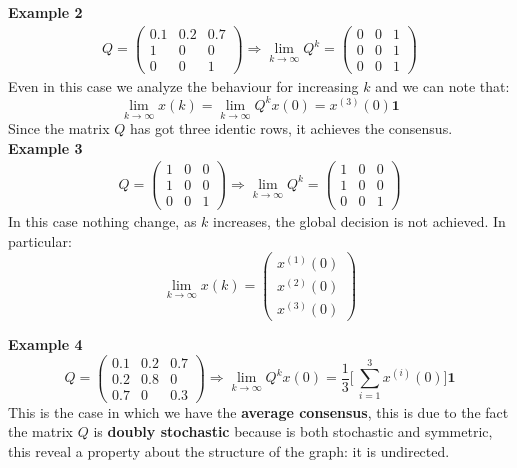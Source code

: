 \noindent
{\color{red}\textbf{Example 2}}
\begin{align*}
    Q=\begin{pmatrix}
        0.1&0.2&0.7\\1&0&0\\0&0&1
    \end{pmatrix} \Longrightarrow 
    \lim_{k\to\infty} Q^k=\begin{pmatrix}
        0&0&1\\
        0&0&1\\
        0&0&1
    \end{pmatrix}
\end{align*}
Even in this case we analyze the behaviour for increasing $k$ and we can note that:
$$
    \lim_{k\to\infty} x(k)=\lim_{k\to\infty} Q^kx(0)=x^{(3)}(0) \mathbf{1}
$$
Since the matrix $Q$ has got three identic rows, it achieves the consensus.\\

\noindent
{\color{red}\textbf{Example 3}}
\begin{align*}
    Q=\begin{pmatrix}
        1&0&0\\
        1&0&0\\
        0&0&1
    \end{pmatrix}  \Longrightarrow
    \lim_{k\to\infty} Q^k = \begin{pmatrix}
        1&0&0\\
        1&0&0\\
        0&0&1
    \end{pmatrix}
\end{align*}
In this case nothing change, as $k$ increases, the global decision is not achieved. In particular: $$\lim_{k\to\infty} x(k)=\begin{pmatrix}
    x^{(1)}(0)\\
    x^{(2)}(0)\\
    x^{(3)}(0)
\end{pmatrix}$$

\noindent
{\color{red}\textbf{Example 4}}\\
\begin{equation*}
    Q=\begin{pmatrix}
        0.1&0.2&0.7\\
        0.2&0.8&0\\
        0.7&0&0.3
    \end{pmatrix} \Longrightarrow 
    \lim_{k\to\infty}Q^{k}x(0)=\frac{1}{3} \bigg[\ 
    \sum_{i=1}^3 x^{(i)}(0) 
    \bigg] \mathbf{1}
\end{equation*}
This is the case in which we have the \textbf{average consensus}, this is due to the fact the matrix $Q$ is \textbf{doubly stochastic} because is both stochastic and symmetric, this reveal a property about the structure of the graph: it is undirected. \\

